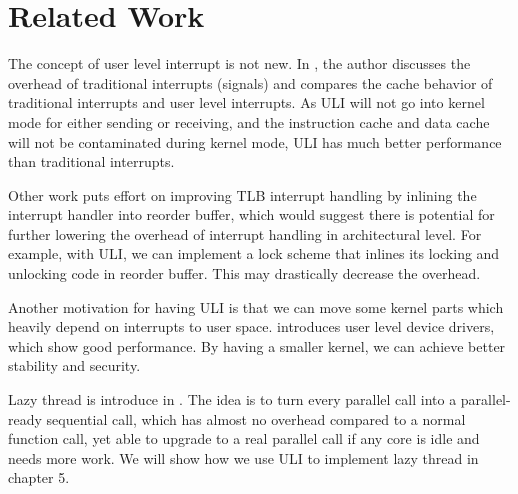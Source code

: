 \section{Related Work}

The concept of user level interrupt is not new. In \cite{parker}, the author discusses the overhead of traditional interrupts (signals) and compares the cache behavior of traditional interrupts and user level interrupts. As ULI will not go into kernel mode for either sending or receiving, and the instruction cache and data cache will not be contaminated during kernel mode, ULI has much better performance than traditional interrupts. 

Other work \cite{jaleel2006line} puts effort on improving TLB interrupt handling by inlining the interrupt handler into reorder buffer, which would suggest there is potential for further lowering the overhead of interrupt handling in architectural level. For example, with ULI, we can implement a lock scheme that inlines its locking and unlocking code in reorder buffer. This may drastically decrease the overhead.

Another motivation for having ULI is that we can move some kernel parts which heavily depend on interrupts to user space. \cite{leslie} introduces user level device drivers, which show good performance. By having a smaller kernel, we can achieve better stability and security.

Lazy thread is introduce in \cite{goldstein}. The idea is to turn every parallel call into a parallel-ready sequential call, which has almost no overhead compared to a normal function call, yet able to upgrade to a real parallel call if any core is idle and needs more work. We will show how we use ULI to implement lazy thread in chapter 5.



